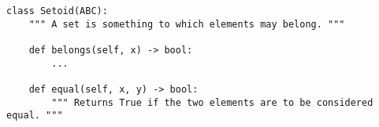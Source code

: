 \begin{verbatim}
class Setoid(ABC):
    """ A set is something to which elements may belong. """

    def belongs(self, x) -> bool:
        ...

    def equal(self, x, y) -> bool:
        """ Returns True if the two elements are to be considered equal. """
\end{verbatim}